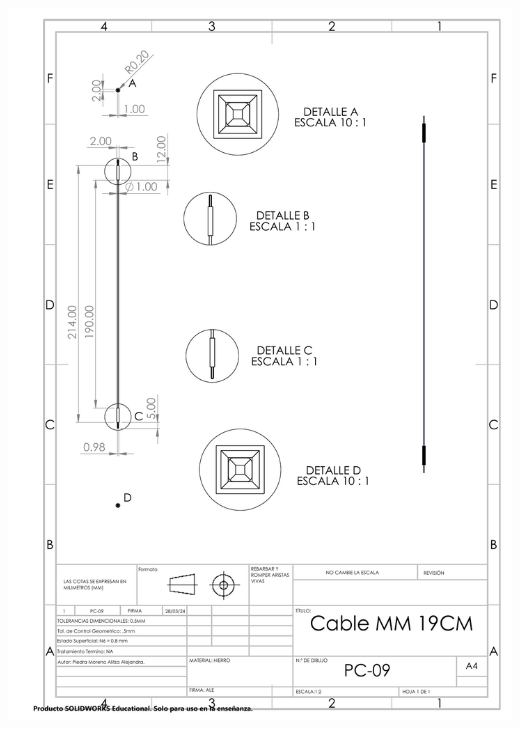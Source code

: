 \begin{center}
\includegraphics[width=.9\textwidth]{22/img/cableMMDibujo.PDF}~\\[15cm]

\end{center}




